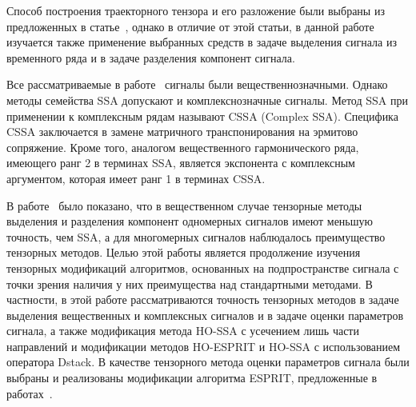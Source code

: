 \documentclass[specialist,
  substylefile=spbu_report.rtx,
subf,href,colorlinks=true, 12pt]{disser}
\theoremstyle{plain}
\theoremstyle{definition}
\theoremstyle{remark}
\begin{document}
Способ построения траекторного тензора и его разложение были
выбраны из предложенных в
статье~\cite{hosvd-hooi-separation}, однако в отличие от этой
статьи, в данной работе изучается также применение
выбранных средств в задаче выделения сигнала из временного ряда и в
задаче разделения компонент сигнала.

Все рассматриваемые в работе~\cite{Thesis2024} сигналы были вещественнозначными.
Однако методы семейства SSA допускают и комплекснозначные сигналы.
Метод SSA при применении к комплексным рядам называют CSSA (Complex SSA).
Специфика CSSA заключается в замене матричного
транспонирования на эрмитово сопряжение.
Кроме того, аналогом вещественного гармонического ряда,
имеющего ранг 2 в терминах SSA, является
экспонента с комплексным аргументом, которая
имеет ранг 1 в терминах CSSA.

В работе~\cite{Thesis2024} было показано, что в
вещественном случае тензорные методы выделения
и разделения компонент одномерных сигналов имеют меньшую точность, чем SSA,
а для многомерных сигналов наблюдалось преимущество тензорных методов.
Целью этой работы является продолжение изучения тензорных модификаций
алгоритмов, основанных на подпространстве сигнала с точки зрения наличия
у них преимущества над стандартными методами.
В частности, в этой работе рассматриваются точность
тензорных методов в задаче выделения вещественных и комплексных сигналов
и в задаче оценки параметров сигнала, а также модификация метода HO-SSA с
усечением лишь части направлений и модификации методов HO-ESPRIT и
HO-SSA с использованием оператора Dstack.
В качестве тензорного метода оценки параметров сигнала были выбраны и
реализованы модификации алгоритма ESPRIT, предложенные в
работах~\cite{hosvd-hooi-separation,Papy2009}.
\end{document}
